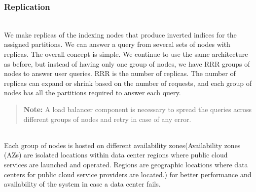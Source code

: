 \subsubsection{Replication}\label{oRhyYDsNsW_GYWM1o68vb}
\\
We make replicas of the indexing nodes that produce inverted indices for the assigned partitions. We can answer a query from several sets of nodes with replicas. The overall concept is simple. We continue to use the same architecture as before, but instead of having only one group of nodes, we have RRR groups of nodes to answer user queries. RRR is the number of replicas. The number of replicas can expand or shrink based on the number of requests, and each group of nodes has all the partitions required to answer each query.
\begin{quote}
\textbf{Note:} A load balancer component is necessary to spread the queries across different groups of nodes and retry in case of any error.
\end{quote}
\\
Each group of nodes is hosted on different availability zones(Availability zones (AZs) are isolated locations within data center regions where public cloud services are launched and operated. Regions are geographic locations where data centers for public cloud service providers are located.) for better performance and availability of the system in case a data center fails.

